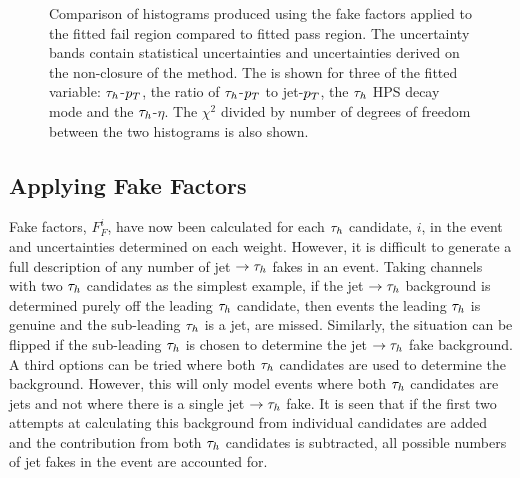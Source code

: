 \begin{figure}[!hbtp]
\caption{Comparison of histograms produced using the fake factors applied to the fitted fail region compared to fitted pass region. The uncertainty bands contain statistical uncertainties and uncertainties derived on the non-closure of the method. The is shown for three of the fitted variable: $\tau_{h}$-$p_{T}$, the ratio of $\tau_{h}$-$p_{T}$ to jet-$p_{T}$, the $\tau_{h}$ HPS decay mode and the $\tau_{h}$-$\eta$. The $\chi^2$ divided by number of degrees of freedom between the two histograms is also shown.}
\label{fig:4tau_ff_closure}
\end{figure}

\subsection{Applying Fake Factors}

Fake factors, $F_{F}^{i}$, have now been calculated for each $\tau_{h}$ candidate, $i$, in the event and uncertainties determined on each weight. 
However, it is difficult to generate a full description of any number of jet $\rightarrow \tau_{h}$ fakes in an event.
Taking channels with two $\tau_{h}$ candidates as the simplest example, if the jet $\rightarrow \tau_{h}$ background is determined purely off the leading $\tau_{h}$ candidate, then events the leading $\tau_{h}$ is genuine and the sub-leading $\tau_{h}$ is a jet, are missed.
Similarly, the situation can be flipped if the sub-leading $\tau_{h}$ is chosen to determine the jet $\rightarrow \tau_{h}$ fake background.
A third options can be tried where both $\tau_{h}$ candidates are used to determine the background.
However, this will only model events where both $\tau_{h}$ candidates are jets and not where there is a single jet $\rightarrow \tau_{h}$ fake. 
It is seen that if the first two attempts at calculating this background from individual candidates are added and the contribution from both $\tau_{h}$ candidates is subtracted, all possible numbers of jet fakes in the event are accounted for. \\

